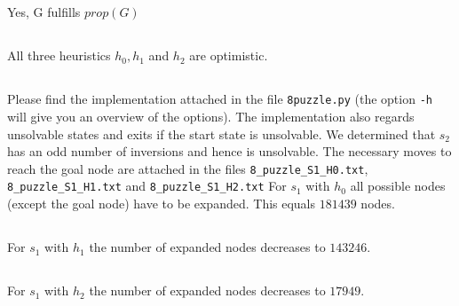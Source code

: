 \documentclass[11pt]{article}
\begin{document}
\subsection{}
Yes, G fulfills $prop(G)$
\subsection{}
All three heuristics $h_0,h_1$ and $h_2$ are optimistic.

\subsection{}
Please find the implementation attached in the file \texttt{8puzzle.py} (the option \texttt{-h} will give you an overview of the options). The implementation also regards unsolvable states and exits if the start state is unsolvable. We determined that $s_2$ has an odd number of inversions and hence is unsolvable. The necessary moves to reach the goal node are attached in the files \texttt{8\_puzzle\_S1\_H0.txt}, \texttt{8\_puzzle\_S1\_H1.txt} and \texttt{8\_puzzle\_S1\_H2.txt} For $s_1$ with $h_0$ all possible nodes (except the goal node) have to be expanded. This equals $181439$ nodes.

\subsection{}
For $s_1$ with $h_1$ the number of expanded nodes decreases to $143246$.

\subsection{}
For $s_1$ with $h_2$ the number of expanded nodes decreases to $17949$.
 
\end{document}
